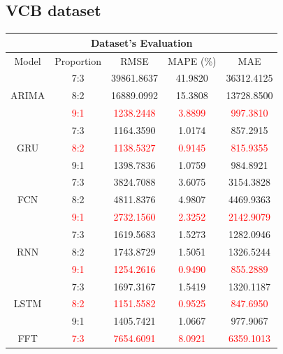 \documentclass{ieeeojies}
\begin{document}
\subsection{VCB dataset} 
\begin{table}[H]
    \centering
    \begin{tabular}{|c|c|c|c|c|}
         \hline
         \multicolumn{5}{|c|}{\textbf{Dataset's Evaluation}}\\
         \hline
         \centering Model & Proportion & RMSE & MAPE (\%) & MAE\\
         \hline
        \multirow{3}{*}{ARIMA} 
        & 7:3 & 39861.8637 & 41.9820 & 36312.4125 \\
        & 8:2 & 16889.0992 & 15.3808 & 13728.8500 \\
        & \textcolor{red}{9:1} & \textcolor{red}{1238.2448} & \textcolor{red}{3.8899} & \textcolor{red}{997.3810} \\
        \hline
        \multirow{3}{*}{GRU} 
        & 7:3 & 1164.3590 & {1.0174} & 857.2915 \\
        & \textcolor{red}{8:2} & \textcolor{red}{1138.5327} & \textcolor{red}{0.9145} & \textcolor{red}{815.9355} \\
        & 9:1 & 1398.7836 & 1.0759 & 984.8921 \\
        \hline
        \multirow{3}{*}{FCN} 
        & 7:3 & 3824.7088 & 3.6075 & 3154.3828 \\
        & 8:2 & 4811.8376 & 4.9807 & 4469.9363 \\
        & \textcolor{red}{9:1} & \textcolor{red}{2732.1560} & \textcolor{red}{2.3252} & \textcolor{red}{2142.9079} \\
        \hline
        \multirow{3}{*}{RNN} 
        & 7:3 & 1619.5683 & 1.5273 & 1282.0946 \\
        & 8:2 & 1743.8729 & 1.5051 & 1326.5244 \\
        & \textcolor{red}{9:1} & \textcolor{red}{1254.2616} & \textcolor{red}{0.9490} & \textcolor{red}{855.2889} \\
        \hline
        \multirow{3}{*}{LSTM} 
        & 7:3 & 1697.3167 & 1.5419 & 1320.1187 \\
        & \textcolor{red}{8:2} & \textcolor{red}{1151.5582} & \textcolor{red}{0.9525} & \textcolor{red}{847.6950} \\
        & 9:1 & 1405.7421 & 1.0667 & 977.9067 \\
        \hline
        \multirow{3}{*}{FFT} 
        & \textcolor{red}{7:3} & \textcolor{red}{7654.6091} & \textcolor{red}{8.0921} & \textcolor{red}{6359.1013} \\
    

\end{tabular}
\end{table}
\end{document}
